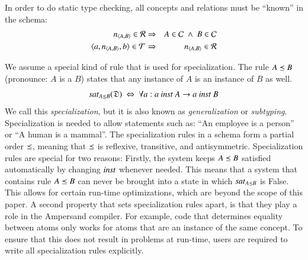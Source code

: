 \documentclass{elsarticle}
\begin{document}
   In order to do static type checking,
   all concepts and relations must be ``known'' in the schema:
\begin{eqnarray}
   \declare{n}{A}{B}\in\rels&\Rightarrow&A\in\concepts\ \wedge\ B\in\concepts
   \label{eqn:relationsIntroduceConcepts}\\
   \triple{a}{\declare{n}{A}{B}}{b}\in\triples&\Rightarrow&\declare{n}{A}{B}\in\rels
   \label{eqn:define R}
\end{eqnarray}

   We assume a special kind of rule that is used for specialization.
   The rule $A\preceq B$ (pronounce: $A$ is a $B$) states that any instance of $A$ is an instance of $B$ as well.
\begin{equation}
   \label{eqn:specialization}
   \sat{A\isa B}{\dataset}\ \Leftrightarrow\ \forall a: a\ \inst\ A\rightarrow a\ \inst\ B
\end{equation}
   We call this {\em specialization}, but it is also known as {\em generalization} or {\em subtyping}.
   Specialization is needed to allow statements such as: ``An employee is a person'' or ``A human is a mammal''.
   The specialization rules in a schema form a partial order $\preceq$,
   meaning that $\preceq$ is reflexive, transitive, and antisymmetric.
   Specialization rules are special for two reasons:
   Firstly, the system keeps $A\preceq B$ satisfied automatically by changing $\text{\it inst\/}$ whenever needed.
   This means that a system that contains rule $A\preceq B$ can never be brought into a state in which $\text{\it sat\/}_{A\preceq B}$ is False.
   This allows for certain run-time optimizations, which are beyond the scope of this paper.
   A second property that sets specialization rules apart, is that they play a role in the Ampersand compiler.
   For example, code that determines equality between atoms only works for atoms that are an instance of the same concept.
   To ensure that this does not result in problems at run-time, users are required to write all specialization rules explicitly.
\end{document}
